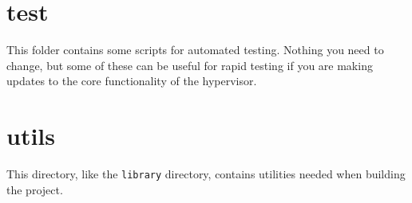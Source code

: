 \documentclass[a4paper,11pt,reqno]{amsart}
\begin{document}
\section{test}
This folder contains some scripts for automated testing. Nothing you need to change, but some of these can be useful for rapid testing if you are making updates to the core functionality of the hypervisor.

\section{utils}
This directory, like the \texttt{library} directory, contains utilities needed when building the project.
\end{document}
